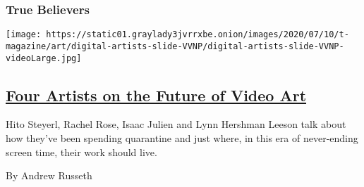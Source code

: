 \begin{enumerate}
{  \subsubsection{True Believers}\label{true-believers-7}}

  \texttt{[image: https://static01.graylady3jvrrxbe.onion/images/2020/07/10/t-magazine/art/digital-artists-slide-VVNP/digital-artists-slide-VVNP-videoLarge.jpg]}

  \hypertarget{four-artists-on-the-future-of-video-art}{%
  \subsection{\texorpdfstring{\href{/2020/07/22/t-magazine/video-art.html}{Four
  Artists on the Future of Video
  Art}}{Four Artists on the Future of Video Art}}\label{four-artists-on-the-future-of-video-art}}

  Hito Steyerl, Rachel Rose, Isaac Julien and Lynn Hershman Leeson talk
  about how they've been spending quarantine and just where, in this era
  of never-ending screen time, their work should live.

  By Andrew Russeth
\end{enumerate}

